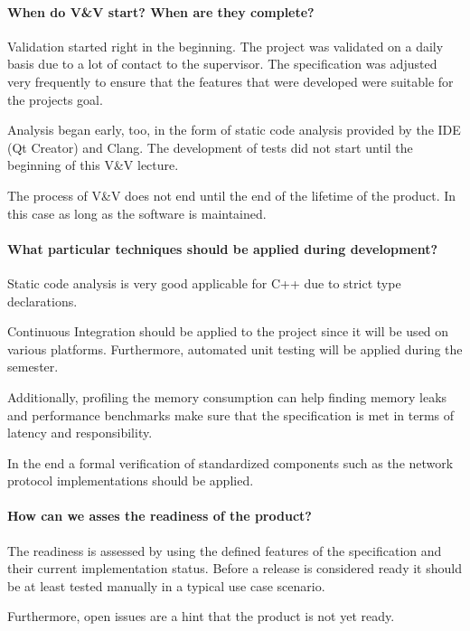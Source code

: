 \documentclass{scrreprt}
\begin{document}
\paragraph{When do V\&V start?  When are they complete?}

Validation started right in the beginning. The project was validated on a daily basis  due to a lot of contact to the supervisor. The specification was adjusted very frequently to ensure that the features that were developed were suitable for the projects goal.

Analysis began early, too, in the form of static code analysis provided by the IDE (Qt Creator) and Clang. The development of tests did not start until the beginning of this V\&V lecture.

The process of V\&V does not end until the end of the lifetime of the product. In this case as long as the software is maintained.

\paragraph{What particular techniques should be applied during development?}

Static code analysis is very good applicable for C++ due to strict type declarations. 

Continuous Integration should be applied to the project since it will be used on various platforms. Furthermore, automated unit testing will be applied during the semester.

Additionally, profiling the memory consumption can help finding memory leaks and performance benchmarks make sure that the specification is met in terms of latency and responsibility.

In the end a formal verification of standardized components such as the network protocol implementations should be applied.

\paragraph{How can we asses the readiness of the product?}

The readiness is assessed by using the defined features of the specification and their current implementation status. Before a release is considered ready it should be at least tested manually in a typical use case scenario.

Furthermore, open issues are a hint that the product is not yet ready.
\end{document}
